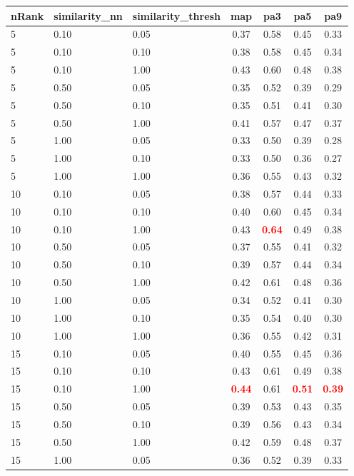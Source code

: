   
\begin{table} 
\begin{center} 
\scriptsize 
 \setlength{\tabcolsep}{.16667em} 
\begin{tabular}{lllcccc} 
nRank & similarity\_nn & similarity\_thresh & map & pa3 & pa5 & pa9 \\ 
\hline 
 5 & 0.10 & 0.05 & 0.37 & 0.58 & 0.45 & 0.33 \\ 
 5 & 0.10 & 0.10 & 0.38 & 0.58 & 0.45 & 0.34 \\ 
 5 & 0.10 & 1.00 & 0.43 & 0.60 & 0.48 & 0.38 \\ 
 5 & 0.50 & 0.05 & 0.35 & 0.52 & 0.39 & 0.29 \\ 
 5 & 0.50 & 0.10 & 0.35 & 0.51 & 0.41 & 0.30 \\ 
 5 & 0.50 & 1.00 & 0.41 & 0.57 & 0.47 & 0.37 \\ 
 5 & 1.00 & 0.05 & 0.33 & 0.50 & 0.39 & 0.28 \\ 
 5 & 1.00 & 0.10 & 0.33 & 0.50 & 0.36 & 0.27 \\ 
 5 & 1.00 & 1.00 & 0.36 & 0.55 & 0.43 & 0.32 \\ 
10 & 0.10 & 0.05 & 0.38 & 0.57 & 0.44 & 0.33 \\ 
10 & 0.10 & 0.10 & 0.40 & 0.60 & 0.45 & 0.34 \\ 
10 & 0.10 & 1.00 & 0.43 & \textbf{\textcolor{red}{0.64}} & 0.49 & 0.38 \\ 
10 & 0.50 & 0.05 & 0.37 & 0.55 & 0.41 & 0.32 \\ 
10 & 0.50 & 0.10 & 0.39 & 0.57 & 0.44 & 0.34 \\ 
10 & 0.50 & 1.00 & 0.42 & 0.61 & 0.48 & 0.36 \\ 
10 & 1.00 & 0.05 & 0.34 & 0.52 & 0.41 & 0.30 \\ 
10 & 1.00 & 0.10 & 0.35 & 0.54 & 0.40 & 0.30 \\ 
10 & 1.00 & 1.00 & 0.36 & 0.55 & 0.42 & 0.31 \\ 
15 & 0.10 & 0.05 & 0.40 & 0.55 & 0.45 & 0.36 \\ 
15 & 0.10 & 0.10 & 0.43 & 0.61 & 0.49 & 0.38 \\ 
15 & 0.10 & 1.00 & \textbf{\textcolor{red}{0.44}} & 0.61 & \textbf{\textcolor{red}{0.51}} & \textbf{\textcolor{red}{0.39}} \\ 
15 & 0.50 & 0.05 & 0.39 & 0.53 & 0.43 & 0.35 \\ 
15 & 0.50 & 0.10 & 0.39 & 0.56 & 0.43 & 0.34 \\ 
15 & 0.50 & 1.00 & 0.42 & 0.59 & 0.48 & 0.37 \\ 
15 & 1.00 & 0.05 & 0.36 & 0.52 & 0.39 & 0.33 \\ 

\end{tabular}
\end{center}
\end{table}
